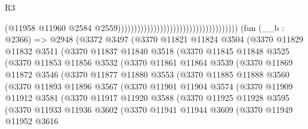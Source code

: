 \begin{lexlean}{R3}
\begin{coremodule}
                                                                            (@11958
                                                                              @11960
                                                                              @2584
                                                                              @2559)))))))))))))))))))))))))))))))))))))
    (fun (__b : @2366) =>
    @2948
      (@3372
        @3497
        (@3370
          @11821
          @11824
          @3504
          (@3370
            @11829
            @11832
            @3511
            (@3370
              @11837
              @11840
              @3518
              (@3370
                @11845
                @11848
                @3525
                (@3370
                  @11853
                  @11856
                  @3532
                  (@3370
                    @11861
                    @11864
                    @3539
                    (@3370
                      @11869
                      @11872
                      @3546
                      (@3370
                        @11877
                        @11880
                        @3553
                        (@3370
                          @11885
                          @11888
                          @3560
                          (@3370
                            @11893
                            @11896
                            @3567
                            (@3370
                              @11901
                              @11904
                              @3574
                              (@3370
                                @11909
                                @11912
                                @3581
                                (@3370
                                  @11917
                                  @11920
                                  @3588
                                  (@3370
                                    @11925
                                    @11928
                                    @3595
                                    (@3370
                                      @11933
                                      @11936
                                      @3602
                                      (@3370
                                        @11941
                                        @11944
                                        @3609
                                        (@3370
                                          @11949
                                          @11952
                                          @3616

\end{coremodule}
\end{lexlean}
